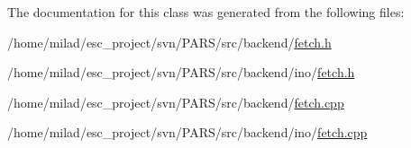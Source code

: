 The documentation for this class was generated from the following files:\begin{DoxyCompactItemize}
\item 
/home/milad/esc\_\-project/svn/PARS/src/backend/\hyperlink{fetch_8h}{fetch.h}\item 
/home/milad/esc\_\-project/svn/PARS/src/backend/ino/\hyperlink{ino_2fetch_8h}{fetch.h}\item 
/home/milad/esc\_\-project/svn/PARS/src/backend/\hyperlink{fetch_8cpp}{fetch.cpp}\item 
/home/milad/esc\_\-project/svn/PARS/src/backend/ino/\hyperlink{ino_2fetch_8cpp}{fetch.cpp}\end{DoxyCompactItemize}
